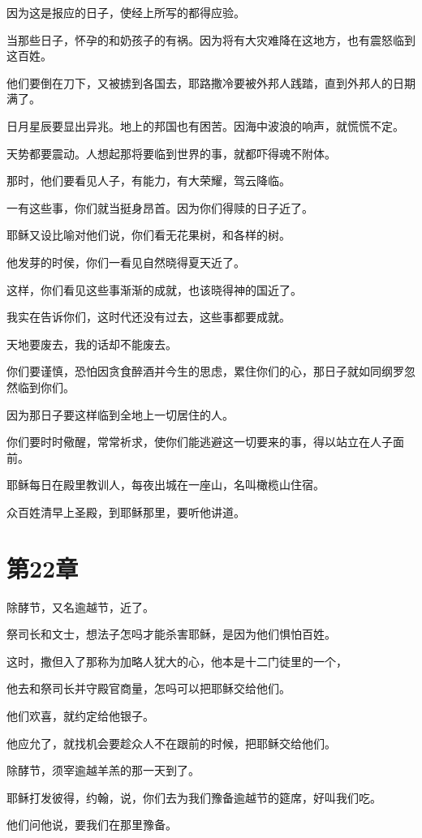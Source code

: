 \documentclass[12pt,oneside]{book}
\begin{document}
因为这是报应的日子，使经上所写的都得应验。

当那些日子，怀孕的和奶孩子的有祸。因为将有大灾难降在这地方，也有震怒临到这百姓。

他们要倒在刀下，又被掳到各国去，耶路撒冷要被外邦人践踏，直到外邦人的日期满了。

日月星辰要显出异兆。地上的邦国也有困苦。因海中波浪的响声，就慌慌不定。

天势都要震动。人想起那将要临到世界的事，就都吓得魂不附体。

那时，他们要看见人子，有能力，有大荣耀，驾云降临。

一有这些事，你们就当挺身昂首。因为你们得赎的日子近了。

耶稣又设比喻对他们说，你们看无花果树，和各样的树。

他发芽的时侯，你们一看见自然晓得夏天近了。

这样，你们看见这些事渐渐的成就，也该晓得神的国近了。

我实在告诉你们，这时代还没有过去，这些事都要成就。

天地要废去，我的话却不能废去。

你们要谨慎，恐怕因贪食醉酒并今生的思虑，累住你们的心，那日子就如同纲罗忽然临到你们。

因为那日子要这样临到全地上一切居住的人。

你们要时时儆醒，常常祈求，使你们能逃避这一切要来的事，得以站立在人子面前。

耶稣每日在殿里教训人，每夜出城在一座山，名叫橄榄山住宿。

众百姓清早上圣殿，到耶稣那里，要听他讲道。

\chapter{第22章}
除酵节，又名逾越节，近了。

祭司长和文士，想法子怎吗才能杀害耶稣，是因为他们惧怕百姓。

这时，撒但入了那称为加略人犹大的心，他本是十二门徒里的一个，

他去和祭司长并守殿官商量，怎吗可以把耶稣交给他们。

他们欢喜，就约定给他银子。

他应允了，就找机会要趁众人不在跟前的时候，把耶稣交给他们。

除酵节，须宰逾越羊羔的那一天到了。

耶稣打发彼得，约翰，说，你们去为我们豫备逾越节的筵席，好叫我们吃。

他们问他说，要我们在那里豫备。
\end{document}
